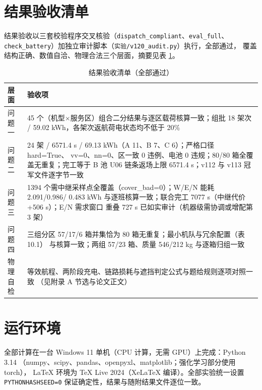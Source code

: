 \section{结果验收清单}

结果验收以三套校验程序交叉核验（\texttt{dispatch\_compliant}、\texttt{eval\_full}、
\texttt{check\_battery}）加独立审计脚本（\texttt{实验/v120\_audit.py}）执行，全部通过，
覆盖结构正确、数值自洽、物理合法三个层面，摘要见表 \ref{tab:verify}。

\begin{table}[!htbp]
\caption{结果验收清单（全部通过）}\label{tab:verify}
\centering
\small
\begin{tabular}{ll}
\toprule
层面 & 验收项 \\
\midrule
问题一 & 45 个（机型$\times$服务区）组合二分结果与逐区载荷核算一致；组批 18 架次 /
59.02 kWh，各架次返航荷电状态均不低于 20\% \\
问题二 & 24 架 / 6571.4 s / 69.13 kWh（A 11、B 7、C 6）；严格口径 hard=True、
vv=0、nn=0、区一致 0 违例、电池 0 违规；80/80 箱全覆盖无重复；完工等于 B 池
U06 链条返场上限 6571.4 s；v112 与 v113 冠军文件逐字节一致 \\
问题三 & 1394 个需中继采样点全覆盖（cover\_bad=0）；W/E/N 能耗 2.091/0.986/
0.483 kWh 与逐班核算一致；联合完工 7077 s（中继代价 +506 s）；E/N 需求窗口
重叠 727 s 已如实审计（机器级需协调或增配第 3 架） \\
问题四 & 三组分区 57/17/6 箱并集恰为 80 箱无重复；最小机队与冗余配置（表 10.1）
与核算一致；两组 57/23 箱、质量 546/212 kg 与逐箱归组一致 \\
物理自检 & 等效航程、两阶段充电、链路损耗与遮挡判定公式与题给规则逐项对照一致
（见附录 A 节选与论文正文） \\
\bottomrule
\end{tabular}
\end{table}

\section{运行环境}

全部计算在一台 Windows 11 单机（CPU 计算，无需 GPU）上完成：Python 3.14
（numpy、scipy、pandas、openpyxl、matplotlib；强化学习部分使用 torch），
LaTeX 环境为 TeX Live 2024（XeLaTeX 编译）。全部实验统一设置
\texttt{PYTHONHASHSEED=0} 保证确定性，结果与随附结果文件逐位一致。